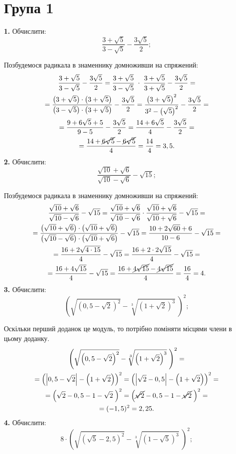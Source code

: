 \section*{Група 1}
\textbf{1.} Обчислити:
$$
\frac{3+\sqrt{5}}{3-\sqrt{5}} - \frac{3\sqrt{5}}{2};
$$

Позбудемося радикала в знаменнику домноживши на спряжений:
\begin{multline*}
\frac{3+\sqrt{5}}{3-\sqrt{5}} - \frac{3\sqrt{5}}{2} = 
\frac{3+\sqrt{5}}{3-\sqrt{5}} \;\cdot\; \frac{3+\sqrt{5}}{3+\sqrt{5}} - \frac{3\sqrt{5}}{2} =\\
= \frac{\left(3+\sqrt{5}\right)\cdot\left(3+\sqrt{5}\right)}{\left(3-\sqrt{5}\right)\cdot\left(3+\sqrt{5}\right)} - \frac{3\sqrt{5}}{2} = 
\frac{\left(3+\sqrt{5}\right)^2}{3^2-\left(\sqrt{5}\right)^2} - \frac{3\sqrt{5}}{2} =\\
= \frac{9 + 6\sqrt{5} + 5}{9 - 5} - \frac{3\sqrt{5}}{2} =
\frac{14+6\sqrt{5}}{4} - \frac{3\sqrt{5}}{2} =\\
= \frac{14+\cancel{6\sqrt{5}}-\cancel{6\sqrt{5}}}{4} =
\frac{14}{4} = 3,5.
\end{multline*}
\textbf{2.} Обчислити:
$$
\frac{\sqrt{10} + \sqrt{6}}{\sqrt{10} - \sqrt{6}} - \sqrt{15};
$$

Позбудемося радикала в знаменнику домноживши на спряжений:
\begin{multline*}
\frac{\sqrt{10} + \sqrt{6}}{\sqrt{10} - \sqrt{6}} - \sqrt{15} =
\frac{\sqrt{10} + \sqrt{6}}{\sqrt{10} - \sqrt{6}} \cdot \frac{\sqrt{10} + \sqrt{6}}{\sqrt{10} + \sqrt{6}} - \sqrt{15} =\\
= \frac{\left(\sqrt{10} + \sqrt{6}\right)\cdot\left(\sqrt{10} + \sqrt{6}\right)}{\left(\sqrt{10} - \sqrt{6}\right)\cdot\left(\sqrt{10} + \sqrt{6}\right)} - \sqrt{15} =
\frac{10 + 2\sqrt{60} + 6}{10 - 6} - \sqrt{15} =\\
= \frac{16 + 2\sqrt{4\cdot15}}{4} - \sqrt{15} =
\frac{16 + 2 \cdot 2 \sqrt{15}}{4} - \sqrt{15} =\\
= \frac{16 + 4\sqrt{15}}{4} - \sqrt{15} =
\frac{16 + \cancel{4\sqrt{15}} - \cancel{4\sqrt{15}}}{4} = \frac{16}{4} = 4.
\end{multline*}
\textbf{3.} Обчислити:
$$
\left(\sqrt{\left(0,5 - \sqrt{2}\right)^2} - \sqrt[3]{\left(1 + \sqrt{2}\right)^3}\;\right)^2;
$$

Оскільки \hfill перший \hfill доданок \hfill це \hfill модуль, \hfill то \hfill потрібно \hfill поміняти \break
місцями члени в цьому доданку.
\begin{multline*}
\left(\sqrt{\left(0,5 - \sqrt{2}\right)^2} - \sqrt[3]{\left(1 + \sqrt{2}\right)^3}\;\right)^2 =\\
= \left(\left|0,5 - \sqrt{2}\right| - \left(1 + \sqrt{2}\right)\right)^2 =
\left(\left|\sqrt{2} - 0,5\right| - \left(1 + \sqrt{2}\right)\right)^2 =\\
= \left(\sqrt{2} - 0,5 - 1 - \sqrt{2}\;\right)^2 =
\left(\cancel{\sqrt{2}} - 0,5 - 1 - \cancel{\sqrt{2}}\;\right)^2 =\\
= (-1,5)^2 = 2,25.
\end{multline*}
\textbf{4.} Обчислити:
$$
8 \cdot \left(\sqrt{\left(\sqrt{5} - 2,5\right)^2} - \sqrt[3]{\left(1 - \sqrt{5}\right)^3}\;\right)^2;
$$

